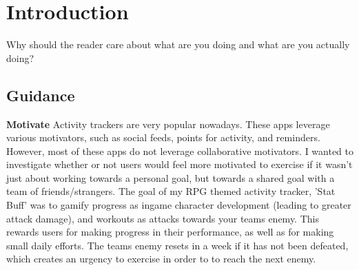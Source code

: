 \documentclass{l4proj}
\begin{document}
%
%
%
%
%
%
%
%
\chapter{Introduction}



Why should the reader care about what are you doing and what are you actually doing?
\section{Guidance}

\textbf{Motivate} 
Activity trackers are very popular nowadays. These apps leverage various motivators, such as social feeds, points for activity, and reminders. However, most of these apps do not leverage collaborative motivators. I wanted to investigate whether or not users would feel more motivated to exercise if it wasn't just about working towards a personal goal, but towards a shared goal with a team of friends/strangers. The goal of my RPG themed activity tracker, 'Stat Buff' was to gamify progress as ingame character development (leading to greater attack damage), and workouts as attacks towards your teams enemy. This rewards users for making progress in their performance, as well as for making small daily efforts. The teams enemy resets in a week if it has not been defeated, which creates an urgency to exercise in order to to reach the next enemy.
\end{document}
